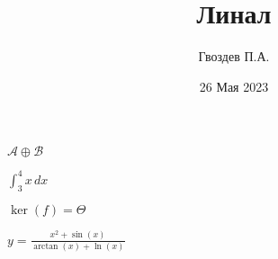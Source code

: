 ﻿\documentclass{article}
\author{Гвоздев П.А.}
\title{Линал}
\date{26 Мая 2023}
\begin{document}
\maketitle
$\mathcal{A}\oplus \mathcal{B} $

 $\int_{3}^{4} x \,dx$

 $\ker (f)=\Theta$
 
 $y=\frac{x^2+\sin(x)}{\arctan(x)+\ln(x)}$
    
\theta 
\end{document}
